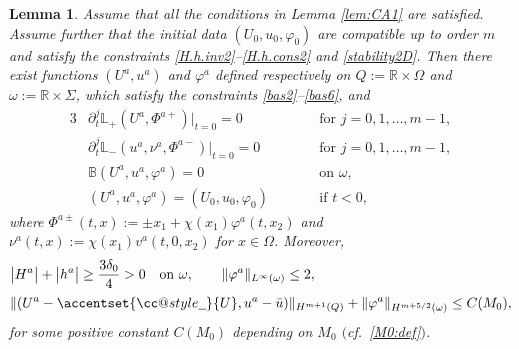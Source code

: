 \documentclass[twoside,11pt]{article}
\makeatletter
\numberwithin{equation}{section}
\newtheorem{lemma}{Lemma}[section]
\def\p{\partial}
\def\widebar{\accentset{{\cc@style\underline{\mskip10mu}}}}
\makeatother
\begin{document}
\begin{lemma}\label{lem:app}
	Assume that all the conditions in Lemma \ref{lem:CA1} are satisfied.
	Assume further that the initial data $(U_0, u_0, \varphi_0)$ are compatible up to order $m$ and satisfy the constraints \eqref{H.h.inv2}--\eqref{H.h.cons2} and \eqref{stability2D}.
	Then
	there exist functions $(U^a,u^a)$ and $\varphi^a$
	defined respectively on $Q:=\mathbb{R}\times \Omega$
	and $\omega:=\mathbb{R}\times \Sigma$, which satisfy the constraints
	\eqref{bas2}--\eqref{bas6},
	and
	\begin{alignat}{3}	
		&\p_t^{j}\mathbb{L}_+(U^{a},\Phi^{a+})\big|_{t=0}=0
		\quad&&\textrm{for } j=0,1,\ldots,m-1,		\label{app1a}\\
		&\p_t^{j}\mathbb{L}_-(u^{a}, \nu^{a},\Phi^{a-})\big|_{t=0}=0
		\quad&&\textrm{for } j=0,1,\ldots,m-1,		\label{app1b}\\		
		& \mathbb{B}(U^a,u^a,\varphi^a)=0\quad &&\textrm{on }\omega ,
		\label{app1d}	\\
		& (U^{a},u^{a}, \varphi^{a})=(U_0, u_0, \varphi_0)\qquad &&\textrm{if } t<0,
		\label{app1e}
	\end{alignat}
	where $\Phi^{a\pm}(t,x):=\pm x_1 +\chi(x_1)\varphi^{a}(t,x_2)$
	and $\nu^a(t,x):=\chi(x_1)v^a(t,0, x_2)$ for  $x\in\Omega$.
	Moreover,
	\begin{align}
		&	\label{app2b}
		\big|{H}^{a}\big|+\big| {h}^{a}\big|\geq \frac{3\delta_0}{4}>0
		\quad \textrm{on }\omega,\qquad
		\|\varphi^a\|_{L^{\infty}(\omega)}\leq 2,\\[0.5mm]			
		&	\|(U^{a}-\widebar{U}, u^{a}-\bar{u})\|_{H^{m+1}(Q)} +\|\varphi^a\|_{H^{m+5/2}(\omega)}  \leq C (M_0),
		\label{app2a}
	\end{align}
	for some positive constant $C(M_0)$ depending on $M_0$ $($cf.~\eqref{M0:def}$)$.
\end{lemma}
\end{document}
